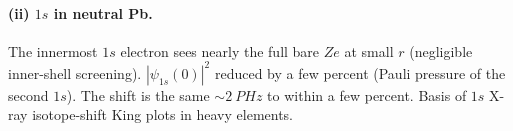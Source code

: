 \documentclass[11pt]{article}
\begin{document}
\paragraph{(ii) $1s$ in neutral Pb.} The innermost $1s$ electron sees nearly the full bare $Ze$ at small $r$ (negligible inner-shell screening). $|\psi_{1s}(0)|^2$ reduced by a few percent (Pauli pressure of the second $1s$). The shift is the same $\sim\!\SI{2}{PHz}$ to within a few percent. Basis of $1s$ X-ray isotope-shift King plots in heavy elements.
\end{document}
